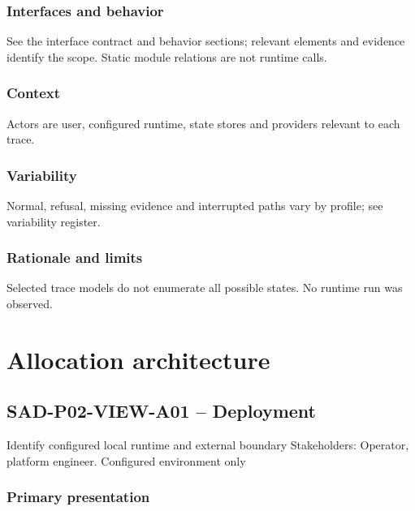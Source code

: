 \documentclass[10pt,letterpaper]{article}
\begin{document}
\subsubsection{Interfaces and behavior}
See the interface contract and behavior sections; relevant elements and evidence identify the scope. Static module relations are not runtime calls.
\subsubsection{Context}
Actors are user, configured runtime, state stores and providers relevant to each trace.
\subsubsection{Variability}
Normal, refusal, missing evidence and interrupted paths vary by profile; see variability register.
\subsubsection{Rationale and limits}
Selected trace models do not enumerate all possible states. No runtime run was observed.

\section{Allocation architecture}
\subsection{SAD-P02-VIEW-A01 -- Deployment}
Identify configured local runtime and external boundary Stakeholders: Operator, platform engineer. Configured environment only
\subsubsection{Primary presentation}
\end{document}
